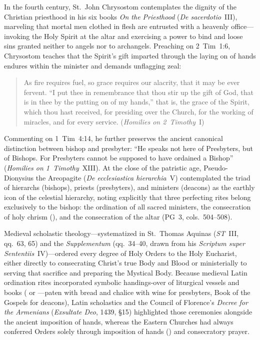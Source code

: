 In the fourth century, St.~John Chrysostom contemplates the dignity of the Christian priesthood in his six books \emph{On the Priesthood} (\emph{De sacerdotio}~III), marveling that mortal men clothed in flesh are entrusted with a heavenly office---invoking the Holy Spirit at the altar and exercising a power to bind and loose sins granted neither to angels nor to archangels. Preaching on 2~Tim~1:6, Chrysostom teaches that the Spirit's gift imparted through the laying on of hands endures within the minister and demands unflagging zeal:
\begin{quotation}
As fire requires fuel, so grace requires our alacrity, that it may be ever fervent. ``I put thee in remembrance that thou stir up the gift of God, that is in thee by the putting on of my hands,'' that is, the grace of the Spirit, which thou hast received, for presiding over the Church, for the working of miracles, and for every service. (\emph{Homilies on 2~Timothy}~I)
\end{quotation}
Commenting on 1~Tim~4:14, he further preserves the ancient canonical distinction between bishop and presbyter: ``He speaks not here of Presbyters, but of Bishops. For Presbyters cannot be supposed to have ordained a Bishop'' (\emph{Homilies on 1~Timothy}~XIII). At the close of the patristic age, Pseudo-Dionysius the Areopagite (\emph{De ecclesiastica hierarchia}~V) contemplated the triad of hierarchs (bishops), priests (presbyters), and ministers (deacons) as the earthly icon of the celestial hierarchy, noting explicitly that three perfecting rites belong exclusively to the bishop: the ordination of all sacred ministers, the consecration of holy chrism (), and the consecration of the altar (PG~3, cols.~504--508).

Medieval scholastic theology---systematized in St.~Thomas Aquinas (\emph{ST}~III, qq.~63, 65) and the \emph{Supplementum} (qq.~34--40, drawn from his \emph{Scriptum super Sententiis}~IV)---ordered every degree of Holy Orders to the Holy Eucharist, either directly to consecrating Christ's true Body and Blood or ministerially to serving that sacrifice and preparing the Mystical Body. Because medieval Latin ordination rites incorporated symbolic handings-over of liturgical vessels and books ( or ---paten with bread and chalice with wine for presbyters, Book of the Gospels for deacons), Latin scholastics and the Council of Florence's \emph{Decree for the Armenians} (\emph{Exsultate Deo}, 1439, \S15) highlighted those ceremonies alongside the ancient imposition of hands, whereas the Eastern Churches had always conferred Orders solely through imposition of hands () and consecratory prayer.

